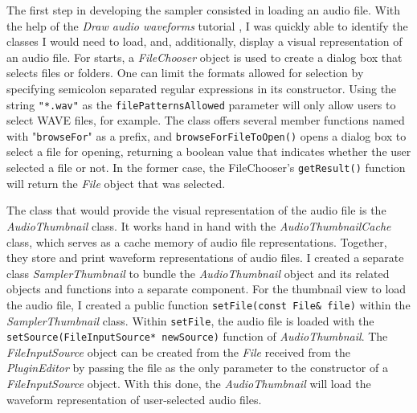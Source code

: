 \documentclass[12pt, a4paper, hidelinks]{article}
\begin{document}
	The first step in developing the sampler consisted in loading an audio file. With the help of the \textit{Draw audio waveforms} tutorial \cite{audiothumbnail}, I was quickly able to identify the classes I would need to load, and, additionally, display a visual representation of an audio file. For starts, a \textit{FileChooser} object is used to create a dialog box that selects files or folders. One can limit the formats allowed for selection by specifying semicolon separated regular expressions in its constructor. Using the string \texttt{"*.wav"} as the \texttt{filePatternsAllowed} parameter will only allow users to select WAVE files, for example. The class offers several member functions named with "\texttt{browseFor}" as a prefix, and \texttt{browseForFileToOpen()} opens a dialog box to select a file for opening, returning a boolean value that indicates whether the user selected a file or not. In the former case, the FileChooser's \texttt{getResult()} function will return the \textit{File} object that was selected. \par
	The class that would provide the visual representation of the audio file is the \textit{AudioThumbnail} class. It works hand in hand with the \textit{AudioThumbnailCache} class, which serves as a cache memory of audio file representations. Together, they store and print waveform representations of audio files. I created a separate class \textit{SamplerThumbnail} to bundle the \textit{AudioThumbnail} object and its related objects and functions into a separate component. For the thumbnail view to load the audio file, I created a public function \texttt{setFile(const File\& file)} within the \textit{SamplerThumbnail} class. Within \texttt{setFile}, the audio file is loaded with the \texttt{setSource(FileInputSource* newSource)} function of \textit{AudioThumbnail}. The \textit{FileInputSource} object can be created from the \textit{File} received from the \textit{PluginEditor} by passing the file as the only parameter to the constructor of a \textit{FileInputSource} object. With this done, the \textit{AudioThumbnail} will load the waveform representation of user-selected audio files.\par
	
\end{document}
